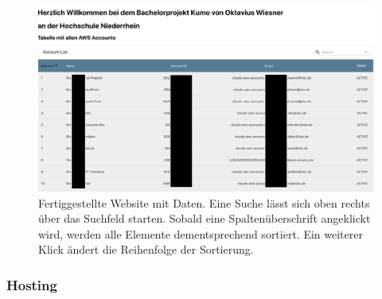  \begin{figure}[htbp]
    \centering
    \includegraphics[width=1.0\textwidth]{50-Implementierung/Webanwendung.png}
    \caption{Fertiggestellte Website mit Daten. Eine Suche lässt sich oben rechts über das Suchfeld starten. Sobald eine Spaltenüberschrift angeklickt wird, werden alle Elemente dementsprechend sortiert. Ein weiterer Klick ändert die Reihenfolge der Sortierung.  }

\end{figure}
\label{FertigSeite}
\subsubsection{Hosting}

